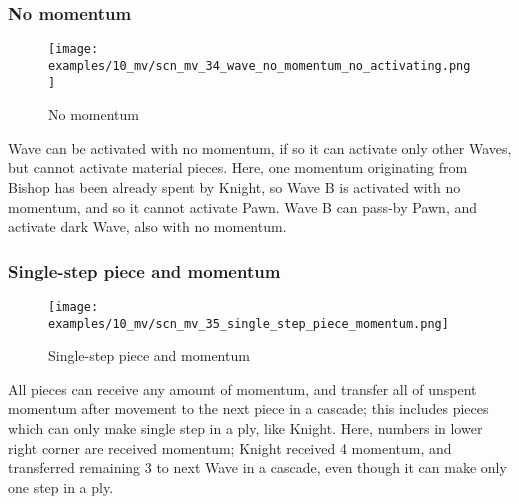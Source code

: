 \clearpage %

\subsubsection*{No momentum}
\label{sec:Miranda's veil/Wave/Cascading Waves/No momentum}

\vspace*{-1.4\baselineskip}
\noindent
\begin{figure}[h]
\texttt{[image: examples/10\_mv/scn\_mv\_34\_wave\_no\_momentum\_no\_activating.png]}
\caption{No momentum}
\label{fig:scn_mv_34_wave_no_momentum_no_activating}
\end{figure}

Wave can be activated with no momentum, if so it can activate only other Waves, but
cannot activate material pieces. Here, one momentum originating from Bishop has been
already spent by Knight, so Wave B is activated with no momentum, and so it cannot
activate Pawn. Wave B can pass-by Pawn, and activate dark Wave, also with no momentum.

\clearpage %

\subsubsection*{Single-step piece and momentum}
\label{sec:Miranda's veil/Wave/Cascading Waves/Single-step piece and momentum}

\vspace*{-1.5\baselineskip}
\noindent
\begin{figure}[h]
\texttt{[image: examples/10\_mv/scn\_mv\_35\_single\_step\_piece\_momentum.png]}
\vspace*{-1.4\baselineskip}
\caption{Single-step piece and momentum}
\label{fig:scn_mv_35_single_step_piece_momentum}
\end{figure}

\vspace*{-0.5\baselineskip}
All pieces can receive any amount of momentum, and transfer all of unspent momentum
after movement to the next piece in a cascade; this includes pieces which can only
make single step in a ply, like Knight. \newline
\indent
Here, numbers in lower right corner are received momentum; Knight received 4 momentum,
and transferred remaining 3 to next Wave in a cascade, even though it can make only one
step in a ply.

